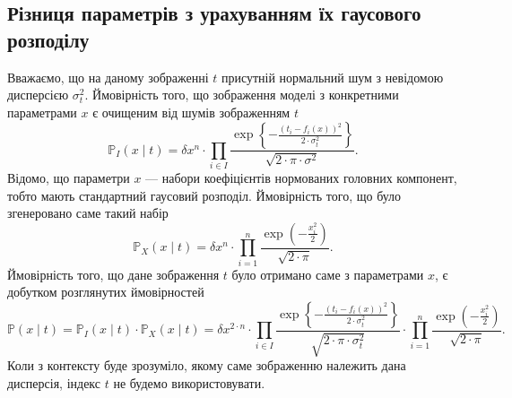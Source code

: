 \subsection{Різниця параметрів з урахуванням їх гаусового розподілу}

Вважаємо, що на даному зображенні $t$
присутній нормальний шум з невідомою дисперсією $\sigma^2_t$.
Ймовірність того, що зображення моделі з конкретними параметрами $x$
є очищеним від шумів зображенням $t$
\begin{equation*}
  \mathbb{P}_I\left( x \mid t \right)
  = \delta x^n \cdot \prod_{i \in I}
    \frac{\exp{\left\{ - \frac{\left( t_i - f_i\left( x \right) \right)^2}
    {2 \cdot \sigma_t^2} \right\}}}{\sqrt{2 \cdot \pi \cdot \sigma^2}}.
\end{equation*}
Відомо, що параметри $x$ --- набори коефіцієнтів нормованих головних компонент,
тобто мають стандартний гаусовий розподіл.
Ймовірність того, що було згенеровано саме такий набір
\begin{equation*}
  \mathbb{P}_X\left( x \mid t \right)
  = \delta x^n \cdot \prod_{i=1}^n
    \frac{\exp{\left( - \frac{x_i^2}{2} \right)}}{\sqrt{2 \cdot \pi}}.
\end{equation*}
Ймовірність того,
що дане зображення $t$ було отримано саме з параметрами $x$,
є добутком розглянутих ймовірностей
\begin{equation*}
  \mathbb{P}\left( x \mid t \right)
  = \mathbb{P}_I\left( x \mid t \right)
    \cdot \mathbb{P}_X\left( x \mid t \right)
    = \delta x^{2 \cdot n} \cdot \prod_{i \in I}
    \frac{\exp{\left\{ - \frac{\left( t_i - f_i\left( x \right) \right)^2}
         {2 \cdot \sigma_t^2} \right\}}}{\sqrt{2 \cdot \pi \cdot \sigma_t^2}}
    \cdot
    \prod_{i=1}^n
    \frac{\exp{\left( - \frac{x_i^2}{2} \right)}}{\sqrt{2 \cdot \pi}}.
\end{equation*}
Коли з контексту буде зрозуміло,
якому саме зображенню належить дана дисперсія,
індекс $t$ не будемо використовувати.

